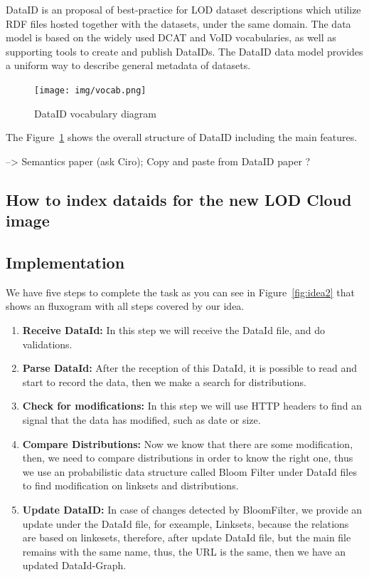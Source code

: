 \documentclass{iosart2c}
\begin{document}
DataID \cite{dataID2014} is an proposal of best-practice for LOD dataset descriptions which utilize RDF files hosted together with the datasets, under the same domain.
The data model is based on the widely used DCAT and VoID vocabularies, as well as supporting tools to create and publish DataIDs.
The DataID data model provides a uniform way to describe general metadata of datasets.

\begin{figure}[tbp] 
  \centering
\texttt{[image: img/vocab.png]}
  \caption{DataID vocabulary diagram}
  \label{fig:vocab}
\end{figure}

The Figure~\ref{fig:vocab} shows the overall structure of DataID including the main features.


--> Semantics paper (ask Ciro);
Copy and paste from DataID paper ?

\subsection{How to index dataids for the new LOD Cloud image}


\subsection{Implementation}
We have five steps to complete the task as you can see in Figure~\ref{fig:idea2} that shows an fluxogram with all steps covered by our idea.

\begin{enumerate}
\item \textbf{Receive DataId:} In this step we will receive the DataId file, and do validations.
\item \textbf{Parse DataId:} After the reception of this DataId, it is possible to read and start to record the data, then we make a search for distributions.
\item \textbf{Check for modifications:} In this step we will use HTTP headers to find an signal that the data has modified, such as date or size.
\item \textbf{Compare Distributions:} Now we know that there are some modification, then, we need to compare distributions in order to know the right one, thus we use an probabilistic data structure called Bloom Filter \cite{bloomfilter} under DataId files to find modification on linksets and distributions.
\item \textbf{Update DataID:} In case of changes detected by BloomFilter, we provide an update under the DataId file, for exeample, Linksets, because the relations are based on linkesets, therefore, after update DataId file, but the main file remains with the same name, thus, the URL is the same, then we have an updated DataId-Graph.
\end{enumerate}
\end{document}

